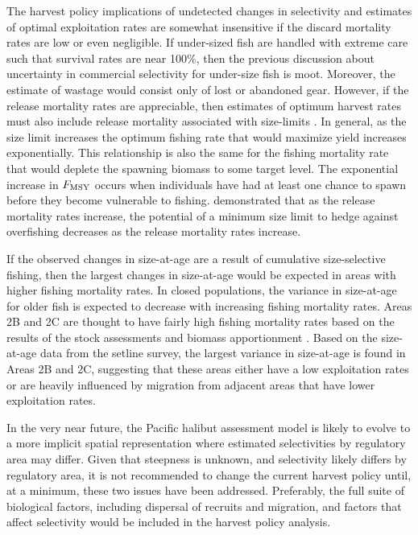 The harvest policy implications of undetected changes in selectivity and estimates of optimal exploitation rates are somewhat insensitive if the discard mortality rates are low or even negligible.  If under-sized fish are handled with extreme care such that survival rates are near 100\%, then the previous discussion about uncertainty in commercial selectivity for under-size fish is moot.  Moreover, the estimate of wastage would consist only of lost or abandoned gear.  However, if the release mortality rates are appreciable, then estimates of optimum harvest rates must also include release mortality associated with size-limits  \citep{goodyear1993spawning,coggins2007ecm}.  In general,  as the size limit increases the optimum fishing rate that would maximize yield increases exponentially.  This relationship is also the same for the fishing mortality rate that would deplete the spawning biomass to some target level.  The exponential increase in $F_{\rm{MSY}}$ occurs when individuals have had at least one chance to spawn before they become vulnerable to fishing.  \cite{pineiii2008car} demonstrated that as the release mortality rates increase, the potential of a minimum size limit to hedge against overfishing decreases as the release mortality rates increase.

If the observed changes in size-at-age are a result of cumulative size-selective fishing, then the largest changes in size-at-age would be expected in areas with higher fishing mortality rates.  In closed populations, the variance in size-at-age for older fish is expected to decrease with increasing fishing mortality rates.  Areas 2B and 2C are thought to have fairly high fishing mortality rates based on the results of the stock assessments and biomass apportionment \citep{Hare2012Rara}.  Based on the size-at-age data from the setline survey, the largest variance in size-at-age is found in Areas 2B and 2C, suggesting that these areas either have a low exploitation rates or are heavily influenced by migration from adjacent areas that have lower exploitation rates.


In the very near future, the Pacific halibut assessment model is likely to evolve to a more implicit spatial representation where estimated selectivities by regulatory area may differ.  Given that steepness is unknown, and selectivity likely differs by regulatory area, it is not recommended to change the current harvest policy until, at a minimum, these two issues have been addressed.  Preferably, the full suite of biological factors, including dispersal of recruits and migration, and factors that affect selectivity would be included in the harvest policy analysis.

